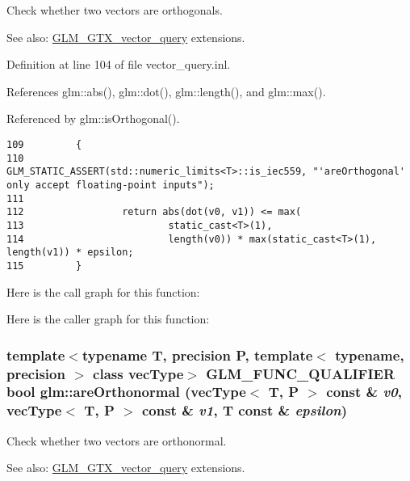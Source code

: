 Check whether two vectors are orthogonals. \begin{Desc}
\item[See also:]\hyperlink{group__gtx__vector__query}{GLM\_\-GTX\_\-vector\_\-query} extensions. \end{Desc}


Definition at line 104 of file vector\_\-query.inl.

References glm::abs(), glm::dot(), glm::length(), and glm::max().

Referenced by glm::isOrthogonal().

\begin{Code}\begin{verbatim}109         {
110                 GLM_STATIC_ASSERT(std::numeric_limits<T>::is_iec559, "'areOrthogonal' only accept floating-point inputs");
111 
112                 return abs(dot(v0, v1)) <= max(
113                         static_cast<T>(1),
114                         length(v0)) * max(static_cast<T>(1), length(v1)) * epsilon;
115         }
\end{verbatim}
\end{Code}




Here is the call graph for this function:

Here is the caller graph for this function:\hypertarget{group__gtx__vector__query_g78e84684059effca3c44c549476db51a}{
\subsubsection[areOrthonormal]{\setlength{\rightskip}{0pt plus 5cm}template$<$typename T, precision P, template$<$ typename, precision $>$ class vecType$>$ GLM\_\-FUNC\_\-QUALIFIER bool glm::areOrthonormal (vecType$<$ T, P $>$ const \& {\em v0}, \/  vecType$<$ T, P $>$ const \& {\em v1}, \/  T const \& {\em epsilon})}}
\label{group__gtx__vector__query_g78e84684059effca3c44c549476db51a}


Check whether two vectors are orthonormal. \begin{Desc}
\item[See also:]\hyperlink{group__gtx__vector__query}{GLM\_\-GTX\_\-vector\_\-query} extensions. \end{Desc}


